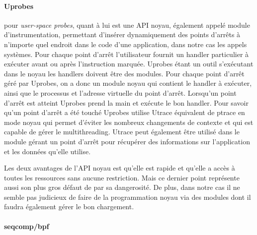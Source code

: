 \paragraph{Uprobes}\cite{INTERCEPTION:AS, INTERCEPTION:MARION}
pour \textit{user-space probes}, quant à lui est une API noyau, également appelé
module d'instrumentation, permettant d'insérer dynamiquement des points d'arrêts
à n'importe quel endroit dans le code d'une application, dans notre cas les
appels systèmes. Pour chaque point d'arrêt l’utilisateur fournit un handler
particulier à exécuter avant ou après l’instruction marquée. Uprobes étant un
outil s'exécutant dans le noyau les handlers doivent être des modules. Pour
chaque point d'arrêt géré par Uprobes, on a donc un module noyau qui contient le
handler à exécuter, ainsi que le processus et l'adresse virtuelle du point
d'arrêt. Lorsqu'un point d'arrêt est atteint Uprobes prend la main et exécute le
bon handler. Pour savoir qu'un point d'arrêt a été touché Uprobes utilise Utrace
équivalent de ptrace en mode noyau qui permet d'éviter les nombreux changements
de contexte et qui est capable de gérer le multithreading. Utrace peut également
être utilisé dans le module gérant un point d'arrêt pour récupérer des
informations sur l'application et les données qu'elle utilise.

Les deux avantages de l'API noyau est qu'elle est rapide et qu'elle a accès à
toutes les ressources sans aucune restriction. Mais ce dernier point représente
aussi son plus gros défaut de par sa dangerosité. De plus, dans notre cas il ne
semble pas judicieux de faire de la programmation noyau via des modules dont il
faudra également gérer le bon chargement.

\paragraph{seqcomp/bpf}



